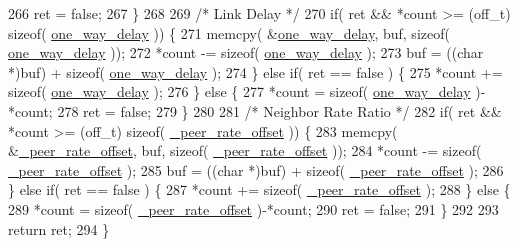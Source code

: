 \begin{DoxyCode}
266         ret = \textcolor{keyword}{false};
267     \}
268 
269     \textcolor{comment}{/* Link Delay */}
270     \textcolor{keywordflow}{if}( ret && *count >= (off\_t) \textcolor{keyword}{sizeof}( \hyperlink{class_common_port_ac6f52fcdc0bbe5e322f5435e494bb827}{one\_way\_delay} )) \{
271         memcpy( &\hyperlink{class_common_port_ac6f52fcdc0bbe5e322f5435e494bb827}{one\_way\_delay}, buf, \textcolor{keyword}{sizeof}( \hyperlink{class_common_port_ac6f52fcdc0bbe5e322f5435e494bb827}{one\_way\_delay} ));
272         *count -= \textcolor{keyword}{sizeof}( \hyperlink{class_common_port_ac6f52fcdc0bbe5e322f5435e494bb827}{one\_way\_delay} );
273         buf = ((\textcolor{keywordtype}{char} *)buf) + \textcolor{keyword}{sizeof}( \hyperlink{class_common_port_ac6f52fcdc0bbe5e322f5435e494bb827}{one\_way\_delay} );
274     \} \textcolor{keywordflow}{else} \textcolor{keywordflow}{if}( ret == \textcolor{keyword}{false} ) \{
275         *count += \textcolor{keyword}{sizeof}( \hyperlink{class_common_port_ac6f52fcdc0bbe5e322f5435e494bb827}{one\_way\_delay} );
276     \} \textcolor{keywordflow}{else} \{
277         *count = \textcolor{keyword}{sizeof}( \hyperlink{class_common_port_ac6f52fcdc0bbe5e322f5435e494bb827}{one\_way\_delay} )-*count;
278         ret = \textcolor{keyword}{false};
279     \}
280 
281     \textcolor{comment}{/* Neighbor Rate Ratio */}
282     \textcolor{keywordflow}{if}( ret && *count >= (off\_t) \textcolor{keyword}{sizeof}( \hyperlink{class_common_port_a43c379422577226fdb4f3d0992c3bcea}{\_peer\_rate\_offset} )) \{
283         memcpy( &\hyperlink{class_common_port_a43c379422577226fdb4f3d0992c3bcea}{\_peer\_rate\_offset}, buf, \textcolor{keyword}{sizeof}( 
      \hyperlink{class_common_port_a43c379422577226fdb4f3d0992c3bcea}{\_peer\_rate\_offset} ));
284         *count -= \textcolor{keyword}{sizeof}( \hyperlink{class_common_port_a43c379422577226fdb4f3d0992c3bcea}{\_peer\_rate\_offset} );
285         buf = ((\textcolor{keywordtype}{char} *)buf) + \textcolor{keyword}{sizeof}( \hyperlink{class_common_port_a43c379422577226fdb4f3d0992c3bcea}{\_peer\_rate\_offset} );
286     \} \textcolor{keywordflow}{else} \textcolor{keywordflow}{if}( ret == \textcolor{keyword}{false} ) \{
287         *count += \textcolor{keyword}{sizeof}( \hyperlink{class_common_port_a43c379422577226fdb4f3d0992c3bcea}{\_peer\_rate\_offset} );
288     \} \textcolor{keywordflow}{else} \{
289         *count = \textcolor{keyword}{sizeof}( \hyperlink{class_common_port_a43c379422577226fdb4f3d0992c3bcea}{\_peer\_rate\_offset} )-*count;
290         ret = \textcolor{keyword}{false};
291     \}
292 
293     \textcolor{keywordflow}{return} ret;
294 \}
\end{DoxyCode}


